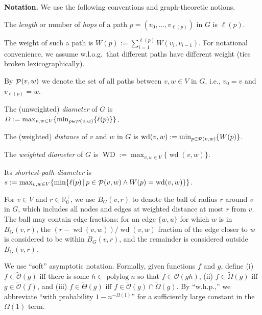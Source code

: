 \documentclass[letterpaper,11pt]{article}
\newcommand{\R}{\mathbb{R}}
\newcommand{\BO}{\mathcal{O}}
\newcommand{\sO}{\tilde{\mathcal{O}}}
\DeclareMathOperator{\Wd}{wd}
\DeclareMathOperator{\WD}{WD}
\DeclareMathOperator{\polylog}{polylog}
\DeclareMathOperator{\cP}{{\cal P}}
\renewcommand{\paragraph}[1]{\smallskip\par\noindent\textbf{#1}}
\begin{document}
\paragraph{Notation.}
We use the following conventions and graph-theoretic notions.
\begin{compactitem}
\item The \emph{length} or number of \emph{hops} of a path $p=(v_0,\ldots,v_{\ell(p)})$ in $G$ is $\ell(p)$.
\item The weight of such a path is
  $W(p):=\sum_{i=1}^{\ell(p)}W(v_i,v_{i-1})$. For notational
  convenience, we assume w.l.o.g.\ that different paths have different
  weight (ties broken lexicographically).
\item By $\cP(v,w)$ we denote the set of all paths between $v,w\in V$ in $G$, i.e., $v_0=v$ and $v_{\ell(p)}=w$.
\item The (unweighted) \emph{diameter} of $G$ is \hfill\\$D:=\max_{v,w\in V}\{\min_{p\in \cP(v,w)}\{\ell(p)\}\}$.
\item The (weighted) \emph{distance} of $v$ and $w$ in $G$ is $\Wd(v,w):=\min_{p\in \cP(v,w)}\{W(p)\}$.
\item The \emph{weighted diameter} of $G$ is $\WD:=\max_{v,w\in V}\{\Wd(v,w)\}$.
\item Its \emph{shortest-path-diameter} is $s:=\max_{v,w\in V}\{\min \{\ell(p)\,|\,p\in \cP(v,w)\wedge W(p)=\Wd(v,w)\}\}$.
\item For $v\in V$ and $r\in \R^+_0$, we use $B_G(v,r)$ to denote the
  ball of radius $r$ around $v$ in $G$, which includes all nodes and
  edges at weighted distance at most $r$ from $v$. The ball may
  contain edge fractions: for an edge $\{w,u\}$ for which $w$ is in
  $B_G(v,r)$, the $(r-\Wd(v,w))/\Wd(v,w)$ fraction of the edge closer to $w$
  is considered to be within $B_G(v,r)$, and the remainder is considered
  outside $B_G(v,r)$.
\end{compactitem}
We use ``soft''  asymptotic notation.
Formally, given functions
$f$ and $g$, define (i) $f\in \tilde{\BO}(g)$ iff there is some $h\in
\polylog n$ so that $f\in \BO(gh)$, (ii) $f\in \tilde{\Omega}(g)$ iff
$g\in\sO(f)$, 
and (iii)
$f\in \tilde{\Theta}(g)$ iff $f\in \tilde{\BO}(g)\cap
\tilde{\Omega}(g)$.
By ``w.h.p.,'' we abbreviate ``with probability $1-n^{-\Omega(1)}$'' for a
sufficiently large constant in the $\Omega(1)$ term.
\end{document}

